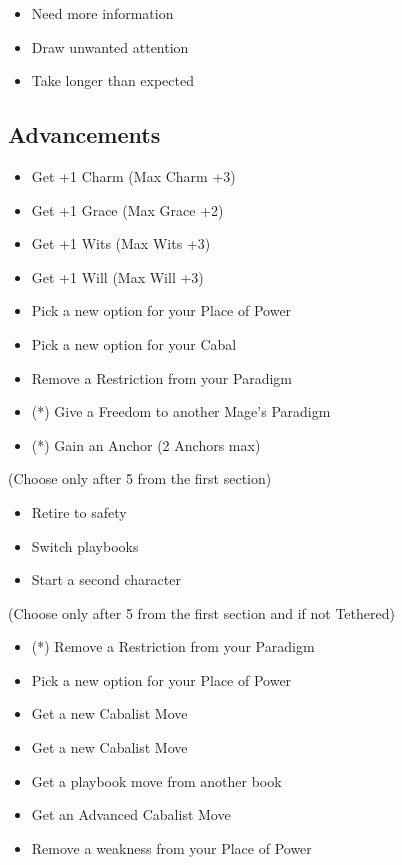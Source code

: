 \documentclass[
]{memoir}
\begin{document}
\begin{itemize}
\tightlist
\item
  Need more information
\item
  Draw unwanted attention
\item
  Take longer than expected
\end{itemize}

\hypertarget{advancements}{%
\subsection{Advancements}\label{advancements}}

\begin{itemize}
\tightlist
\item
  Get +1 Charm (Max Charm +3)
\item
  Get +1 Grace (Max Grace +2)
\item
  Get +1 Wits (Max Wits +3)
\item
  Get +1 Will (Max Will +3)
\item
  Pick a new option for your Place of Power
\item
  Pick a new option for your Cabal
\item
  Remove a Restriction from your Paradigm
\item
  (*) Give a Freedom to another Mage's Paradigm
\item
  (*) Gain an Anchor (2 Anchors max)
\end{itemize}

(Choose only after 5 from the first section)

\begin{itemize}
\tightlist
\item
  Retire to safety
\item
  Switch playbooks
\item
  Start a second character
\end{itemize}

(Choose only after 5 from the first section and if not Tethered)

\begin{itemize}
\tightlist
\item
  (*) Remove a Restriction from your Paradigm
\item
  Pick a new option for your Place of Power
\item
  Get a new Cabalist Move
\item
  Get a new Cabalist Move
\item
  Get a playbook move from another book
\item
  Get an Advanced Cabalist Move
\item
  Remove a weakness from your Place of Power
\end{itemize}
\end{document}
